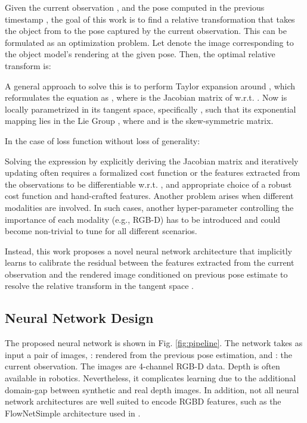 \documentclass[letterpaper, 10 pt, conference]{ieeeconf}
\begin{document}
Given the current observation , and the pose computed in the previous timestamp , the goal of this work is to find a relative transformation  that takes the object from  to the pose captured by the current observation. This can be formulated as an optimization problem. Let  denote the image corresponding to the object model's rendering at the given pose. Then, the optimal relative transform is:
\vspace{-0.05in}

A general approach to solve this is to perform Taylor expansion around , which reformulates the equation as , where  is the Jacobian matrix of  w.r.t. . Now  is locally parametrized in its tangent space, specifically , such that its exponential mapping lies in the Lie Group
, where  and  is the skew-symmetric matrix.

In the case of  loss function without loss of generality:
\vspace{-0.1in}

Solving the expression by explicitly deriving the Jacobian matrix and iteratively updating often requires a formalized cost function or the features extracted from the observations to be differentiable w.r.t. , and appropriate choice of a robust cost function and hand-crafted features. Another problem arises when different modalities are involved. In such cases, another hyper-parameter controlling the importance of each modality (e.g., RGB-D) has to be introduced \cite{pauwels2015simtrack} and could become non-trivial to tune for all different scenarios. 

Instead, this work proposes a novel neural network architecture that implicitly learns to calibrate the residual between the features extracted from the current observation and the rendered image conditioned on previous pose estimate to resolve the relative transform in the tangent space . 

\subsection{Neural Network Design}
The proposed neural network is shown in Fig. \ref{fig:pipeline}. The network takes as input a pair of images, : rendered from the previous pose estimation, and : the current observation. The images are 4-channel RGB-D data. Depth is often available in robotics. Nevertheless, it complicates learning due to the additional domain-gap between synthetic and real depth images. In addition, not all neural network architectures are well suited to encode RGBD features, such as the FlowNetSimple architecture \cite{fischer2015flownet} used in \cite{li2018deepim}.
\end{document}
